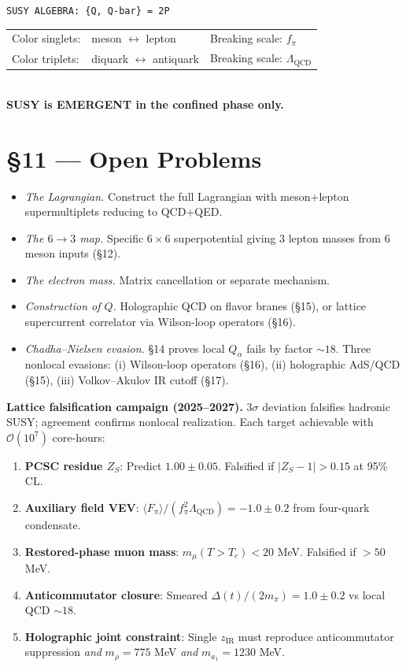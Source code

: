 \documentclass[11pt,a4paper]{article}
\newcommand{\Lqcd}{\Lambda_{\text{QCD}}}
\newcommand{\fpi}{f_\pi}
\newcommand{\mpi}{m_\pi}
\newcommand{\mmu}{m_\mu}
\begin{document}
\begin{center}
\texttt{SUSY ALGEBRA: \{Q, Q-bar\} = 2P} \\[6pt]
\begin{tabular}{lll}
Color singlets: & meson $\leftrightarrow$ lepton & Breaking scale: $\fpi$ \\
Color triplets: & diquark $\leftrightarrow$ antiquark & Breaking scale: $\Lqcd$ \\
\end{tabular} \\[6pt]
\textbf{SUSY is EMERGENT in the confined phase only.}
\end{center}

\section*{\S 11 --- Open Problems}

\begin{itemize}\item \emph{The Lagrangian.}  Construct the full Lagrangian with meson+lepton supermultiplets reducing to QCD+QED.
\item \emph{The $6\to 3$ map.}  Specific $6\times 6$ superpotential giving 3 lepton masses from 6 meson inputs (\S 12).
\item \emph{The electron mass.}  Matrix cancellation or separate mechanism.
\item \emph{Construction of $Q$.}  Holographic QCD on flavor branes (\S 15), or lattice supercurrent correlator via Wilson-loop operators (\S 16).
\item \emph{Chadha--Nielsen evasion.}  \S 14 proves local $Q_\alpha$ fails by factor $\sim 18$.  Three nonlocal evasions: (i) Wilson-loop operators (\S 16), (ii) holographic AdS/QCD (\S 15), (iii) Volkov--Akulov IR cutoff (\S 17).
\end{itemize}

\textbf{Lattice falsification campaign (2025--2027).}  $3\sigma$ deviation falsifies hadronic SUSY; agreement confirms nonlocal realization.  Each target achievable with $\mathcal{O}(10^7)$ core-hours:
\begin{enumerate}\item \textbf{PCSC residue $Z_S$}: Predict $1.00 \pm 0.05$.  Falsified if $|Z_S - 1| > 0.15$ at 95\% CL.
\item \textbf{Auxiliary field VEV}: $\langle F_\pi\rangle/(\fpi^2\Lqcd) = -1.0 \pm 0.2$ from four-quark condensate.
\item \textbf{Restored-phase muon mass}: $\mmu(T > T_c) < 20$ MeV.  Falsified if ${>}50$ MeV.
\item \textbf{Anticommutator closure}: Smeared $\Delta(t)/(2\mpi) = 1.0 \pm 0.2$ vs local QCD $\sim 18$.
\item \textbf{Holographic joint constraint}: Single $z_{\text{IR}}$ must reproduce anticommutator suppression \emph{and} $m_\rho = 775$ MeV \emph{and} $m_{a_1} = 1230$ MeV.
\end{enumerate}
\end{document}
